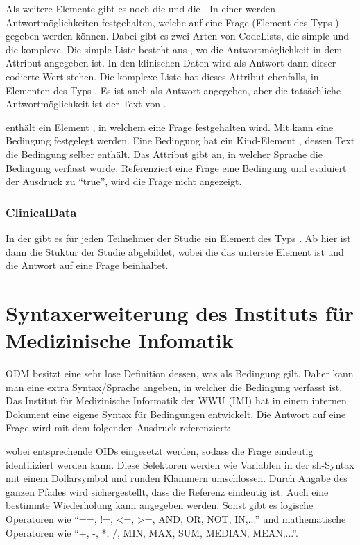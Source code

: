 Als weitere Elemente gibt es noch die  und die .
In einer  werden Antwortmöglichkeiten festgehalten, welche auf eine Frage (Element des Typs ) gegeben werden können.
Dabei gibt es zwei Arten von CodeLists, die simple und die komplexe.
Die simple Liste besteht aus , wo die Antwortmöglichkeit in dem Attribut  angegeben ist.
In den klinischen Daten wird als Antwort dann dieser codierte Wert stehen.
Die komplexe Liste hat dieses Attribut ebenfalls, in Elementen des Typs . Es ist auch als Antwort angegeben, aber die tatsächliche Antwortmöglichkeit ist der Text von .

 enthält ein Element , in welchem eine Frage festgehalten wird.
Mit  kann eine Bedingung festgelegt werden.
Eine Bedingung hat ein Kind-Element , dessen Text die Bedingung selber enthält.
Das Attribut  gibt an, in welcher Sprache die Bedingung verfasst wurde.
Referenziert eine Frage eine Bedingung und evaluiert der Ausdruck zu \enquote{true}, wird die Frage nicht angezeigt.

\subsubsection{ClinicalData}

In der  gibt es für jeden Teilnehmer der Studie ein Element des Typs .
Ab hier ist dann die Stuktur der Studie abgebildet, wobei die  das unterste Element ist und die Antwort auf eine Frage beinhaltet.

\section{Syntaxerweiterung des Instituts für Medizinische Infomatik}

ODM besitzt eine sehr lose Definition dessen, was als Bedingung gilt. Daher kann man eine extra Syntax/Sprache angeben, in welcher die Bedingung verfasst ist.
Das Institut für Medizinische Informatik der WWU (IMI) hat in einem internen Dokument eine eigene Syntax für Bedingungen entwickelt.
Die Antwort auf eine Frage wird mit dem folgenden Ausdruck referenziert: 


\noindent wobei entsprechende OIDs eingesetzt werden, sodass die Frage eindeutig identifiziert werden kann.
Diese Selektoren werden wie Variablen in der sh-Syntax mit einem Dollarsymbol und runden Klammern umschlossen.
Durch Angabe des ganzen Pfades wird sichergestellt, dass die Referenz eindeutig ist. Auch eine bestimmte Wiederholung kann angegeben werden.
Sonst gibt es logische Operatoren wie \enquote{==, !=, <=, >=, AND, OR, NOT, IN,...} und mathematische Operatoren wie \enquote{+, -, *, /, MIN, MAX, SUM, MEDIAN, MEAN,...}.

